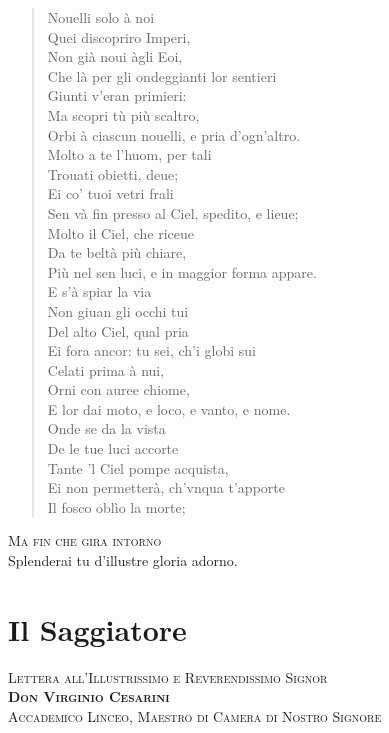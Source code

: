 \documentclass[11pt,twoside,openany]{book}
\begin{document}
\begin{verse}
Nouelli solo à noi \\
Quei discopriro Imperi, \\
Non già noui àgli Eoi, \\
Che là per gli ondeggianti lor sentieri \\
Giunti v'eran primieri: \\
Ma scopri tù più scaltro, \\
Orbi à ciascun nouelli, e pria d'ogn'altro. \\[0.8em]
Molto a te l'huom, per tali \\
Trouati obietti, deue; \\
Ei co' tuoi vetri frali \\
Sen và fin presso al Ciel, spedito, e lieue; \\
Molto il Ciel, che riceue \\
Da te beltà più chiare, \\
Più nel sen luci, e in maggior forma appare. \\[0.8em]
E s'à spiar la via \\
Non giuan gli occhi tui \\
Del alto Ciel, qual pria \\
Ei fora ancor: tu sei, ch'i globi sui \\
Celati prima à nui, \\
Orni con auree chiome, \\
E lor dai moto, e loco, e vanto, e nome. \\[0.8em]
Onde se da la vista \\
De le tue luci accorte \\
Tante 'l Ciel pompe acquista, \\
Ei non permetterà, ch'vnqua t'apporte \\
Il fosco oblìo la morte; \\
\end{verse}
\begin{center}

\textsc{Ma fin che gira intorno}\\{\small Splenderai tu d'illustre gloria adorno.}

\end{center}

\mainmatter
\chapter{Il Saggiatore}
\begin{center}
{\large\scshape Lettera all'Illustrissimo e Reverendissimo Signor\\
\textbf{Don Virginio Cesarini}\\
Accademico Linceo, Maestro di Camera di Nostro Signore\par}
\end{center}
\bigskip
\end{document}
